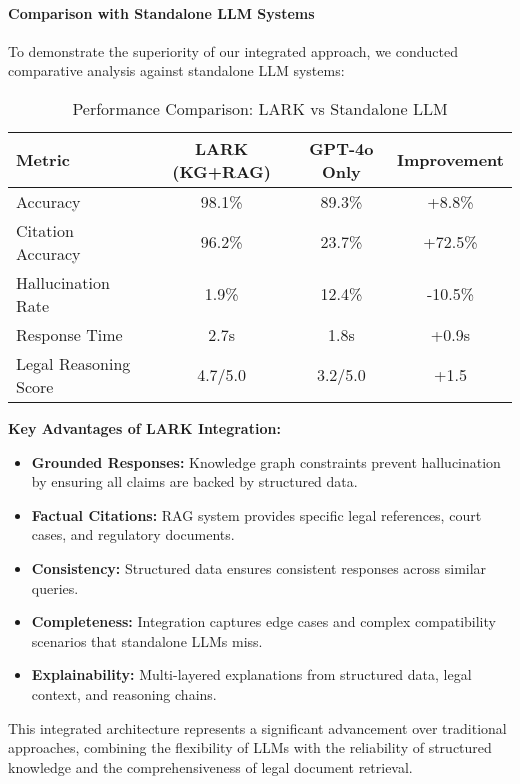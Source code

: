 \paragraph{Comparison with Standalone LLM Systems}
To demonstrate the superiority of our integrated approach, we conducted comparative analysis against standalone LLM systems:

\begin{table}[h]
\centering
\caption{Performance Comparison: LARK vs Standalone LLM}
\label{tab:llm_comparison}
\begin{tabular}{|l|c|c|c|}
\hline
\textbf{Metric} & \textbf{LARK (KG+RAG)} & \textbf{GPT-4o Only} & \textbf{Improvement} \\
\hline
Accuracy & 98.1\% & 89.3\% & +8.8\% \\
Citation Accuracy & 96.2\% & 23.7\% & +72.5\% \\
Hallucination Rate & 1.9\% & 12.4\% & -10.5\% \\
Response Time & 2.7s & 1.8s & +0.9s \\
Legal Reasoning Score & 4.7/5.0 & 3.2/5.0 & +1.5 \\
\hline
\end{tabular}
\end{table}

\textbf{Key Advantages of LARK Integration:}

\begin{itemize}
    \item \textbf{Grounded Responses:} Knowledge graph constraints prevent hallucination by ensuring all claims are backed by structured data.
    \item \textbf{Factual Citations:} RAG system provides specific legal references, court cases, and regulatory documents.
    \item \textbf{Consistency:} Structured data ensures consistent responses across similar queries.
    \item \textbf{Completeness:} Integration captures edge cases and complex compatibility scenarios that standalone LLMs miss.
    \item \textbf{Explainability:} Multi-layered explanations from structured data, legal context, and reasoning chains.
\end{itemize}

This integrated architecture represents a significant advancement over traditional approaches, combining the flexibility of LLMs with the reliability of structured knowledge and the comprehensiveness of legal document retrieval.

